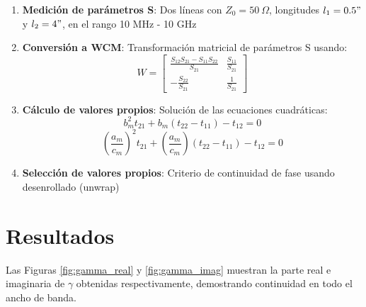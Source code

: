 \documentclass{article}   %
\theoremstyle{mytheoremstyle}
\theoremstyle{mytheoremstyle}
\theoremstyle{myproblemstyle}
\begin{document}
\begin{minipage}{0.49\textwidth}
        \begin{enumerate}
            \item \textbf{Medición de parámetros S}: Dos líneas con $Z_0 = 50\ \Omega$, longitudes $l_1 = 0.5"$ y $l_2 = 4"$, en el rango 10 MHz - 10 GHz
            \item \textbf{Conversión a WCM}: Transformación matricial de parámetros S usando:
            \begin{equation}
                W = \begin{bmatrix}
                \frac{S_{12}S_{21}-S_{11}S_{22}}{S_{21}} & \frac{S_{11}}{S_{21}} \\
                -\frac{S_{22}}{S_{21}} & \frac{1}{S_{21}}
                \end{bmatrix}
            \end{equation}
            \item \textbf{Cálculo de valores propios}: Solución de las ecuaciones cuadráticas:
            \begin{equation}
                b_m^2 t_{21} + b_m (t_{22} - t_{11}) - t_{12} = 0
            \end{equation}
            \begin{equation}
                (\frac{a_m}{c_m})^2 t_{21} + (\frac{a_m}{c_m}) (t_{22} - t_{11}) - t_{12} = 0
            \end{equation}
            \item \textbf{Selección de valores propios}: Criterio de continuidad de fase usando desenrollado (unwrap)
        \end{enumerate}

    
        {\centering\section*{\large Resultados}}
        Las Figuras \ref{fig:gamma_real} y \ref{fig:gamma_imag} muestran la parte real e imaginaria de $\gamma$ obtenidas respectivamente, demostrando continuidad en 
        todo el ancho de banda.

    \end{minipage}
    \hspace{0.38 cm}
\end{document}
